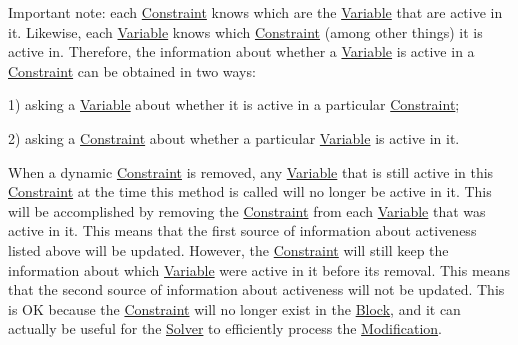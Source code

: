 Important note\+: each \mbox{\hyperlink{class_s_m_spp__di__unipi__it_1_1_constraint}{Constraint}} knows which are the \mbox{\hyperlink{class_s_m_spp__di__unipi__it_1_1_variable}{Variable}} that are active in it. Likewise, each \mbox{\hyperlink{class_s_m_spp__di__unipi__it_1_1_variable}{Variable}} knows which \mbox{\hyperlink{class_s_m_spp__di__unipi__it_1_1_constraint}{Constraint}} (among other things) it is active in. Therefore, the information about whether a \mbox{\hyperlink{class_s_m_spp__di__unipi__it_1_1_variable}{Variable}} is active in a \mbox{\hyperlink{class_s_m_spp__di__unipi__it_1_1_constraint}{Constraint}} can be obtained in two ways\+:

1) asking a \mbox{\hyperlink{class_s_m_spp__di__unipi__it_1_1_variable}{Variable}} about whether it is active in a particular \mbox{\hyperlink{class_s_m_spp__di__unipi__it_1_1_constraint}{Constraint}};

2) asking a \mbox{\hyperlink{class_s_m_spp__di__unipi__it_1_1_constraint}{Constraint}} about whether a particular \mbox{\hyperlink{class_s_m_spp__di__unipi__it_1_1_variable}{Variable}} is active in it.

When a dynamic \mbox{\hyperlink{class_s_m_spp__di__unipi__it_1_1_constraint}{Constraint}} is removed, any \mbox{\hyperlink{class_s_m_spp__di__unipi__it_1_1_variable}{Variable}} that is still active in this \mbox{\hyperlink{class_s_m_spp__di__unipi__it_1_1_constraint}{Constraint}} at the time this method is called will no longer be active in it. This will be accomplished by removing the \mbox{\hyperlink{class_s_m_spp__di__unipi__it_1_1_constraint}{Constraint}} from each \mbox{\hyperlink{class_s_m_spp__di__unipi__it_1_1_variable}{Variable}} that was active in it. This means that the first source of information about activeness listed above will be updated. However, the \mbox{\hyperlink{class_s_m_spp__di__unipi__it_1_1_constraint}{Constraint}} will still keep the information about which \mbox{\hyperlink{class_s_m_spp__di__unipi__it_1_1_variable}{Variable}} were active in it before its removal. This means that the second source of information about activeness will not be updated. This is OK because the \mbox{\hyperlink{class_s_m_spp__di__unipi__it_1_1_constraint}{Constraint}} will no longer exist in the \mbox{\hyperlink{class_s_m_spp__di__unipi__it_1_1_block}{Block}}, and it can actually be useful for the \mbox{\hyperlink{class_s_m_spp__di__unipi__it_1_1_solver}{Solver}} to efficiently process the \mbox{\hyperlink{class_s_m_spp__di__unipi__it_1_1_modification}{Modification}}.

